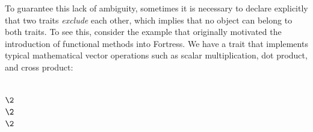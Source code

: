 To guarantee this lack of ambiguity, sometimes it is necessary
to declare explicitly that two traits \emph{exclude} each other,
which implies that no object can belong to both traits.
To see this, consider the example that originally motivated
the introduction of functional methods into Fortress.
We have a  trait that implements typical mathematical vector operations
such as scalar multiplication, dot product, and cross product:
\begin{codeexamplesize}
\begin{tabbing}
 \\
\(\2\) \\
\(\2\) \\
\(\2\) \\
\end{tabbing}
\end{codeexamplesize}
